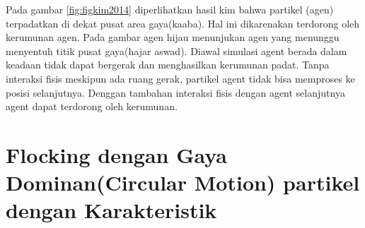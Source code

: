 
\hspace{0.6cm} Pada gambar \ref{fig:figkim2014} diperlihatkan hasil kim bahwa partikel (agen) terpadatkan di dekat pusat area gaya(kaaba). Hal ini dikarenakan terdorong oleh kerumunan agen. Pada gambar agen hijau menunjukan agen yang menunggu menyentuh titik pusat gaya(hajar aswad). Diawal simulasi agent berada dalam keadaan tidak dapat bergerak dan menghasilkan kerumunan padat. Tanpa interaksi fisis meskipun ada ruang gerak, partikel agent tidak bisa memproses ke posisi selanjutnya. Denggan tambahan interaksi fisis dengan agent selanjutnya agent dapat terdorong oleh kerumunan.
\section{Flocking dengan Gaya Dominan(Circular Motion) partikel dengan Karakteristik}%

